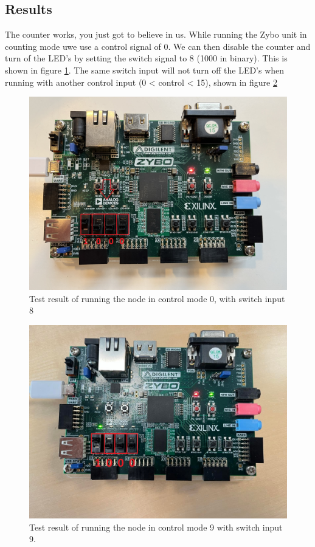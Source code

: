 \documentclass[a4paper,12pt]{report}    %
\begin{document}
\subsection{Results}

The counter works, you just got to believe in us. While running the Zybo unit in counting mode uwe use a control signal of 0. We can then disable the counter and turn of the LED's by setting the switch signal to 8 (1000 in binary). This is shown in figure \ref{FIG::27::MODE0}. The same switch input will not turn off the LED's when running with another control input (0 < control < 15), shown in figure \ref{FIG::27::MODE1}

\begin{figure}[H]
  \centering
  \includegraphics[width=\linewidth]{latex/figures/ass2_27_result_0x8.jpeg}
  \caption{Test result of running the node in control mode 0, with switch input 8}
  \label{FIG::27::MODE0}
\end{figure}

\begin{figure}[H]
  \centering
  \includegraphics[width=\linewidth]{latex/figures/ass2_27_crl15_result.jpg}
  \caption{Test result of running the node in control mode 9 with switch input 9.}
  \label{FIG::27::MODE1}
\end{figure}
\end{document}
